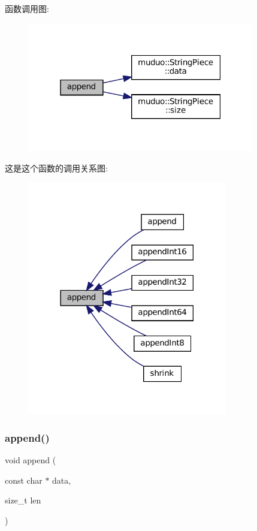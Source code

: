 函数调用图\+:
\nopagebreak
\begin{figure}[H]
\begin{center}
\leavevmode
\includegraphics[width=280pt]{classmuduo_1_1net_1_1Buffer_af02baace4e1946f318dfa5c4d5d4bb3c_cgraph}
\end{center}
\end{figure}
这是这个函数的调用关系图\+:
\nopagebreak
\begin{figure}[H]
\begin{center}
\leavevmode
\includegraphics[width=246pt]{classmuduo_1_1net_1_1Buffer_af02baace4e1946f318dfa5c4d5d4bb3c_icgraph}
\end{center}
\end{figure}
\mbox{\label{classmuduo_1_1net_1_1Buffer_adece1d853752b95184d19c78228a0c39}} 
\subsubsection{\texorpdfstring{append()}{append()}\hspace{0.1cm}{\footnotesize\ttfamily [2/3]}}
{\footnotesize\ttfamily void append (\begin{DoxyParamCaption}\item[{const char $\ast$}]{data,  }\item[{size\+\_\+t}]{len }\end{DoxyParamCaption})\hspace{0.3cm}{\ttfamily [inline]}}



